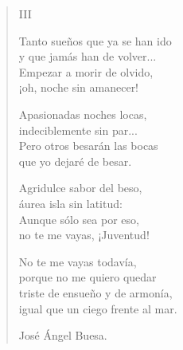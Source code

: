 \documentclass[11pt, portrait, twoside, notitlepage, openright]{book}
\begin{document}
\begin{verse}
\begin{center}
III
\end{center}

Tanto sueños que ya se han ido\\
y que jamás han de volver...\\
Empezar a morir de olvido,\\
¡oh, noche sin amanecer!
\newpage

Apasionadas noches locas,\\
indeciblemente sin par...\\
Pero otros besarán las bocas\\
que yo dejaré de besar.
\newline

Agridulce sabor del beso,\\
áurea isla sin latitud:\\
Aunque sólo sea por eso,\\
no te me vayas, ¡Juventud!
\newline

No te me vayas todavía,\\
porque no me quiero quedar\\
triste de ensueño y de armonía,\\
igual que un ciego frente al mar.
\newline

José Ángel Buesa.
\end{verse}
\end{document}
